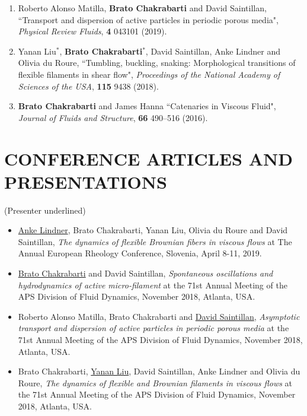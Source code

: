 \documentclass[10pt]{res} %
\begin{document}
\begin{resume}
\begin{enumerate}
	
	\item Roberto Alonso Matilla, \textbf{Brato Chakrabarti} and David Saintillan, ``Transport and dispersion of active particles in periodic porous media", \textit{Physical Review Fluids}, \textbf{4} 043101 (2019). 
	
	\item Yanan Liu$^*$, \textbf{Brato Chakrabarti}$^*$, David Saintillan, Anke Lindner and Olivia du Roure, ``Tumbling, buckling, snaking: Morphological transitions
	of flexible filaments in shear flow", \textit{Proceedings of the National Academy of Sciences of the USA}, \textbf{115} 9438 (2018).
	
	
	\item \textbf{Brato Chakrabarti} and James Hanna ``Catenaries in Viscous Fluid", \textit{Journal of Fluids and Structure}, \textbf{66} 490–516 (2016).
\end{enumerate}



\section{{CONFERENCE ARTICLES AND PRESENTATIONS}} 
\vspace*{1mm}
{(Presenter underlined)}
\vspace*{1mm}
\begin{itemize}
	
	\item \underline{Anke Lindner}, Brato Chakrabarti, Yanan Liu, Olivia du Roure and David Saintillan, \textit{The dynamics of flexible Brownian fibers in viscous flows} at  The Annual European Rheology Conference, Slovenia, April 8-11, 2019.
	
	\item \underline{Brato Chakrabarti} and David Saintillan, \textit{Spontaneous oscillations and hydrodynamics of active micro-filament} at the 71st Annual Meeting of the APS Division of Fluid Dynamics, November 2018, Atlanta, USA. 
	
	\item Roberto Alonso Matilla, Brato Chakrabarti and \underline{David Saintillan}, \textit{Asymptotic transport and dispersion of active particles in periodic porous media} at the 71st Annual Meeting of the APS Division of Fluid Dynamics, November 2018, Atlanta, USA. 
	
	\item Brato Chakrabarti, \underline{Yanan Liu}, David Saintillan, Anke Lindner and Olivia du Roure, \textit{The dynamics of flexible and Brownian filaments in viscous flows} at the 71st Annual Meeting of the APS Division of Fluid Dynamics, November 2018, Atlanta, USA. 
	

\end{itemize}
\end{resume}
\end{document}
